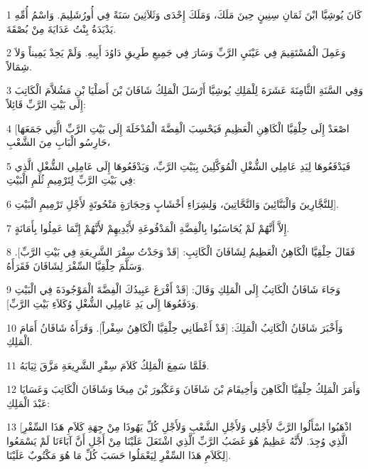 \par 1 كَانَ يُوشِيَّا ابْنَ ثَمَانِ سِنِينٍ حِينَ مَلَكَ، وَمَلَكَ إِحْدَى وَثَلاَثِينَ سَنَةً فِي أُورُشَلِيمَ. وَاسْمُ أُمِّهِ يَدْيَدَةُ بِنْتُ عَدَايَةَ مِنْ بُصْقَةَ.
\par 2 وَعَمِلَ الْمُسْتَقِيمَ فِي عَيْنَيِ الرَّبِّ وَسَارَ فِي جَمِيعِ طَرِيقِ دَاوُدَ أَبِيهِ. وَلَمْ يَحِدْ يَمِيناً وَلاَ شِمَالاً.
\par 3 وَفِي السَّنَةِ الثَّامِنَةَ عَشَرَةَ لِلْمَلِكِ يُوشِيَّا أَرْسَلَ الْمَلِكُ شَافَانَ بْنَ أَصَلْيَا بْنِ مَشُلاَّمَ الْكَاتِبَ إِلَى بَيْتِ الرَّبِّ قَائِلاً:
\par 4 [اصْعَدْ إِلَى حِلْقِيَّا الْكَاهِنِ الْعَظِيمِ فَيَحْسِبَ الْفِضَّةَ الْمُدْخَلَةَ إِلَى بَيْتِ الرَّبِّ الَّتِي جَمَعَهَا حَارِسُو الْبَابِ مِنَ الشَّعْبِ،
\par 5 فَيَدْفَعُوهَا لِيَدِ عَامِلِي الشُّغْلِ الْمُوَكَّلِينَ بِبَيْتِ الرَّبِّ، وَيَدْفَعُوهَا إِلَى عَامِلِي الشُّغْلِ الَّذِي فِي بَيْتِ الرَّبِّ لِتَرْمِيمِ ثُلَمِ الْبَيْتِ:
\par 6 لِلنَّجَّارِينَ وَالْبَنَّائِينَ وَالنَّحَّاتِينَ، وَلِشِرَاءِ أَخْشَابٍ وَحِجَارَةٍ مَنْحُوتَةٍ لأَجْلِ تَرْمِيمِ الْبَيْتِ].
\par 7 إِلاَّ أَنَّهُمْ لَمْ يُحَاسَبُوا بِالْفِضَّةِ الْمَدْفُوعَةِ لأَيْدِيهِمْ لأَنَّهُمْ إِنَّمَا عَمِلُوا بِأَمَانَةٍ.
\par 8 فَقَالَ حِلْقِيَّا الْكَاهِنُ الْعَظِيمُ لِشَافَانَ الْكَاتِبِ: [قَدْ وَجَدْتُ سِفْرَ الشَّرِيعَةِ فِي بَيْتِ الرَّبِّ]. وَسَلَّمَ حِلْقِيَّا السِّفْرَ لِشَافَانَ فَقَرَأَهُ.
\par 9 وَجَاءَ شَافَانُ الْكَاتِبُ إِلَى الْمَلِكِ وَقَالَ: [قَدْ أَفْرَغَ عَبِيدُكَ الْفِضَّةَ الْمَوْجُودَةَ فِي الْبَيْتِ وَدَفَعُوهَا إِلَى يَدِ عَامِلِي الشُّغْلِ وُكَلاَءِ بَيْتِ الرَّبِّ].
\par 10 وَأَخْبَرَ شَافَانُ الْكَاتِبُ الْمَلِكَ: [قَدْ أَعْطَانِي حِلْقِيَّا الْكَاهِنُ سِفْراً]. وَقَرَأَهُ شَافَانُ أَمَامَ الْمَلِكِ.
\par 11 فَلَمَّا سَمِعَ الْمَلِكُ كَلاَمَ سِفْرِ الشَّرِيعَةِ مَزَّقَ ثِيَابَهُ.
\par 12 وَأَمَرَ الْمَلِكُ حِلْقِيَّا الْكَاهِنَ وَأَخِيقَامَ بْنَ شَافَانَ وَعَكْبُورَ بْنَ مِيخَا وَشَافَانَ الْكَاتِبَ وَعَسَايَا عَبْدَ الْمَلِكِ:
\par 13 [اذْهَبُوا اسْأَلُوا الرَّبَّ لأَجْلِي وَلأَجْلِ الشَّعْبِ وَلأَجْلِ كُلِّ يَهُوذَا مِنْ جِهَةِ كَلاَمِ هَذَا السِّفْرِ الَّذِي وُجِدَ. لأَنَّهُ عَظِيمٌ هُوَ غَضَبُ الرَّبِّ الَّذِي اشْتَعَلَ عَلَيْنَا مِنْ أَجْلِ أَنَّ آبَاءَنَا لَمْ يَسْمَعُوا لِكَلاَمِ هَذَا السِّفْرِ لِيَعْمَلُوا حَسَبَ كُلِّ مَا هُوَ مَكْتُوبٌ عَلَيْنَا].
